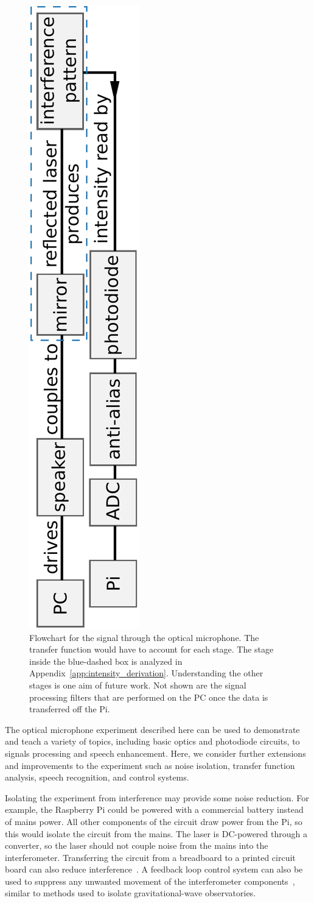 \documentclass[paper-main.tex]{subfiles}
\begin{document}
\begin{figure}
	\includegraphics[height=.8\textwidth, angle=-90]{figures/pipeline.pdf}
	\caption{\label{fig:pipeline_highlighted}
Flowchart for the signal through the optical microphone. The transfer function would have to account for each stage. 
The stage inside the blue-dashed box is analyzed in Appendix~\ref{app:intensity_derivation}. Understanding the other stages is one aim of future work. Not shown are the signal processing filters that are performed on the PC once the data is transferred off the Pi.
}
\end{figure}

The optical microphone experiment described here can be used to demonstrate and teach a variety of topics, including basic optics and photodiode circuits, to signals processing and speech enhancement. Here, we consider further extensions and improvements to the experiment such as noise isolation, transfer function analysis, speech recognition, and control systems.



Isolating the experiment from interference may provide some noise reduction. 
For example, the Raspberry Pi could be powered with a commercial battery instead of mains power. 
All other components of the circuit draw power from the Pi, so this would isolate the circuit from the mains. 
The laser is DC-powered through a converter, so the laser should not couple noise from the mains into the interferometer. 
Transferring the circuit from a breadboard to a printed circuit board can also reduce interference~\cite{elfekey2013design}.
A feedback loop control system can also be used to suppress any unwanted movement of the interferometer components~\citep{abbott2017exploring, Sekiguchi:2016bmv, verhoeven2009robust}, similar to methods used to isolate gravitational-wave observatories. 
\end{document}
